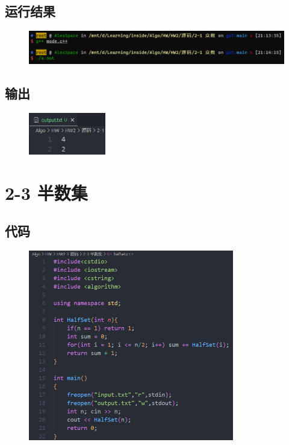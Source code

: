 \documentclass[11pt]{article}  %
\begin{document}
\subsection*{运行结果}

    \begin{figure}[H]
        \centering
        \includegraphics[width = 1\textwidth]{pic/2-1res.png}
    \end{figure}

\subsection*{输出}

    \begin{figure}[H]
        \centering
        \includegraphics[width = 0.3\textwidth]{pic/2-1output.png}
    \end{figure}

\section*{2-3 半数集}

\subsection*{代码}

    \begin{figure}[H]
        \centering
        \includegraphics[width = 0.8\textwidth]{pic/2-2src.png}
    \end{figure}
\end{document}
